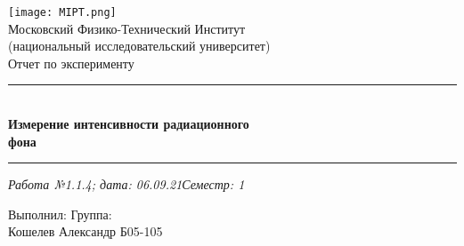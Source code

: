 \documentclass[12pt,a4paper]{scrartcl}
\begin{document}
	\graphicspath{{C:/Users/Alex/OneDrive/Изображения/TexImgs}}
	
	\newcommand{\ms}{\mathstrut}
	\newcommand{\msp}{\hspace{0.5cm}}
	\newcommand{\al}{\alpha}
	\newcommand{\dg}{^\circ}
	\newcommand{\qd}[2]{^{\frac{#1}{#2}}}
	\newcommand{\qdm}[2]{^{-\frac{#1}{#2}}}
	\newcommand{\lm}[2]{\underset{#1 \rightarrow #2}{\lim}}
	\newcommand{\sfrac}[2]{\dfrac{\strut #1}{\strut #2}}
	\newcommand{\equal}[1]{\overset{(#1)}{=}}
	\newcommand{\linevdots}{\ \raisebox{-.08\height}{\vdots}\ }
	\newcommand{\linecvdots}{\ \raisebox{-.08\height}{\vdots}\hspace{-0.13cm}\raisebox{.15\height}{\cancel{\phantom{a}}\hspace{0.06cm}}}
	\newcommand{\combox}[1]{\ms \msp \msp \begin{minipage}{0.95\linewidth}
			#1
	\end{minipage}}
	
	\newtheorem{pr}{Задача}
	\newtheorem{ex}{Пример}
	
	\newenvironment{slv}{\ms \msp \textit{Решение:}}{}
	\newenvironment{proof}{\ms \msp \textit{Доказательство: }}{\hfill $\square$}
	
	\begin{titlepage}
		
		\vspace*{\fill}
		
		\begin{center}
			\texttt{[image: MIPT.png]}
			\\[0.7cm]\Huge Московский Физико-Технический Институт\\(национальный исследовательский университет)
			\\[2cm]\LARGE Отчет по эксперименту
			\\[0.5cm]\noindent\rule{\textwidth}{1pt}
			\\\Huge\textbf{Измерение интенсивности радиационного\\фона}
			\\[-0.5cm]\noindent\rule{\textwidth}{1pt}
		\end{center}
		
		\begin{flushleft}
			\textit{Работа №1.1.4; дата: 06.09.21}\hfill\textit{Семестр: 1}
		\end{flushleft}
		
		\vspace*{\fill}
		
		\begin{flushleft}
			Выполнил: \hspace{\fill} Группа:
			\\Кошелев Александр \hspace{\fill} Б05-105
		\end{flushleft}
	\end{titlepage}
	
\end{document}
